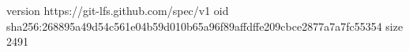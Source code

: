 version https://git-lfs.github.com/spec/v1
oid sha256:268895a49d54c561e04b59d010b65a96f89affdffe209cbce2877a7a7fc55354
size 2491
